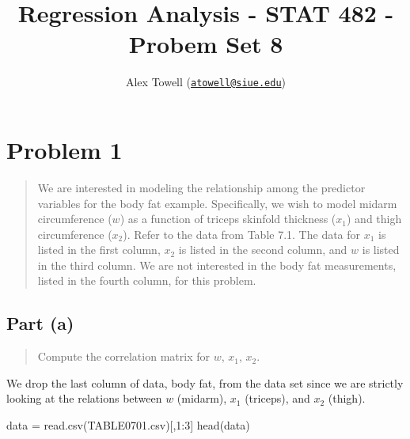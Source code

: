 \documentclass[
]{article}
\title{Regression Analysis - STAT 482 - Probem Set 8}
\author{Alex Towell
(\href{mailto:atowell@siue.edu}{\nolinkurl{atowell@siue.edu}})}
\date{}
\newenvironment{Shaded}{\begin{snugshade}}{\end{snugshade}}
\newcommand{\DecValTok}[1]{\textcolor[rgb]{0.00,0.00,0.81}{#1}}
\newcommand{\FunctionTok}[1]{\textcolor[rgb]{0.00,0.00,0.00}{#1}}
\newcommand{\NormalTok}[1]{#1}
\newcommand{\OtherTok}[1]{\textcolor[rgb]{0.56,0.35,0.01}{#1}}
\newcommand{\SpecialCharTok}[1]{\textcolor[rgb]{0.00,0.00,0.00}{#1}}
\newcommand{\StringTok}[1]{\textcolor[rgb]{0.31,0.60,0.02}{#1}}
\begin{document}
\maketitle

\newcommand{\sos}[1]{\mathrm{SS_{#1}}}
\newcommand{\ms}[1]{\mathrm{MS_{#1}}}
\newcommand{\sd}{\operatorname{sd}}
\newcommand{\var}{\operatorname{var}}
\newcommand{\expect}{\operatorname{E}}
\newcommand{\corr}{\operatorname{cor}}
\newcommand{\cov}{\operatorname{cov}}
\newcommand{\se}{\operatorname{se}}
\newcommand{\eval}[2]{\left. #1 \right\vert_{#2}}
\newcommand{\degf}[1]{\mathrm{df_{#1}}}
\newcommand{\entropy}{\operatorname{H}}

\hypertarget{problem-1}{%
\section{Problem 1}\label{problem-1}}

\begin{quote}
We are interested in modeling the relationship among the predictor
variables for the body fat example. Specifically, we wish to model
midarm circumference (\(w\)) as a function of triceps skinfold thickness
(\(x_1\)) and thigh circumference (\(x_2\)). Refer to the data from
Table 7.1. The data for \(x_1\) is listed in the first column, \(x_2\)
is listed in the second column, and \(w\) is listed in the third column.
We are not interested in the body fat measurements, listed in the fourth
column, for this problem.
\end{quote}

\hypertarget{part-a}{%
\subsection{Part (a)}\label{part-a}}

\begin{quote}
Compute the correlation matrix for \(w\), \(x_1\), \(x_2\).
\end{quote}

We drop the last column of data, body fat, from the data set since we
are strictly looking at the relations between \(w\) (midarm), \(x_1\)
(triceps), and \(x_2\) (thigh).

\begin{Shaded}
\begin{Highlighting}[]
\NormalTok{data }\OtherTok{=} \FunctionTok{read.csv}\NormalTok{(}\StringTok{\textquotesingle{}TABLE0701.csv\textquotesingle{}}\NormalTok{)[,}\DecValTok{1}\SpecialCharTok{:}\DecValTok{3}\NormalTok{]}
\FunctionTok{head}\NormalTok{(data)}
\end{Highlighting}
\end{Shaded}
\end{document}
